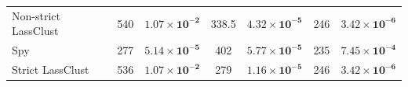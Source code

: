 \documentclass[11pt]{article}
\begin{document}
\begin{table}[H]
\begin{tabular}{lccccc c}
Non-strict LassClust 

& 540 & $\mathbf{1.07\times10^{-2}}$ 

& 338.5 & $\mathbf{4.32\times10^{-5}}$ 

& 246 & $\mathbf{3.42\times10^{-6}}$ \\ 

 

Spy 

& 277 & $\mathbf{5.14\times10^{-5}}$ 

& 402 & $\mathbf{5.77\times10^{-5}}$ 

& 235 & $\mathbf{7.45\times10^{-4}}$ \\ 

 

Strict LassClust 

& 536 & $\mathbf{1.07\times10^{-2}}$ 

& 279 & $\mathbf{1.16\times10^{-5}}$ 

& 246 & $\mathbf{3.42\times10^{-6}}$ \\ 

\bottomrule 

\end{tabular} 

\end{table} 
\end{document}
